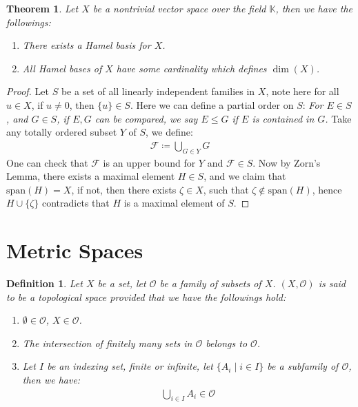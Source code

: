 \documentclass[11pt]{book}
\theoremstyle{break}
\theoremstyle{break}
\newtheorem{thm}{Theorem}[section]
\newtheorem{defn}{Definition}[corL]
\newcommand{\F}{\mathcal{F}}
\newcommand{\spa}{\text{span}}
\begin{document}
\begin{thm}
Let $X$ be a nontrivial vector space over the field $\mathbb{K}$, then we have the followings:
\begin{enumerate}[topsep=3pt,itemsep=-1ex,partopsep=1ex,parsep=1ex]
\item There exists a Hamel basis for $X$.
\item All Hamel bases of $X$ have some cardinality which defines $\dim(X)$. 
\end{enumerate}
\end{thm}
\begin{proof}
Let $S$ be a set of all linearly independent families in $X$, note here for all $u \in X$, if $u \neq 0$, then $\{ u \} \in S$. Here we can define a partial order on $S$:
\textit{For $E\in S$, and $G\in S$, if $E, G$ can be compared, we say $E\leq G$ if $E$ is contained in $G$.}
Take any totally ordered subset $Y$ of $S$,  we define:
\begin{align*}
\F \coloneqq \bigcup_{G \in Y} G
\end{align*}
One can check that $\F$ is an upper bound for $Y$ and $\F \in S$. Now by Zorn's Lemma, there exists a maximal element $H \in S$, and we claim that $\spa(H) = X$, if not, then there exists $\zeta \in X$, such that $\zeta \notin \spa (H)$, hence $H \cup \{ \zeta\}$ contradicts that $H$ is a maximal element of $S$.  
\end{proof}




\newpage
\section[Metric Spaces]{\color{red}Metric Spaces\color{black}}
\begin{defn}
Let $X$ be a set, let $\mathcal{O}$ be a family of subsets of $X$. $(X,\mathcal{O})$ is said to be a topological space provided that we have the followings hold:
\begin{enumerate}[topsep=3pt,itemsep=-1ex,partopsep=1ex,parsep=1ex]
\item $\emptyset \in \mathcal{O}$, $X \in \mathcal{O}$.
\item The intersection of finitely many sets in $\mathcal{O}$ belongs to $\mathcal{O}$.
\item Let $I$ be an indexing set, finite or infinite, let $\{A_i \mid i\in I\}$ be a subfamily of $\mathcal{O}$, then we have:
\begin{align*}
\bigcup_{i \in I}A_i \in \mathcal{O} 
\end{align*}
\end{enumerate}
\end{defn}
\end{document}
